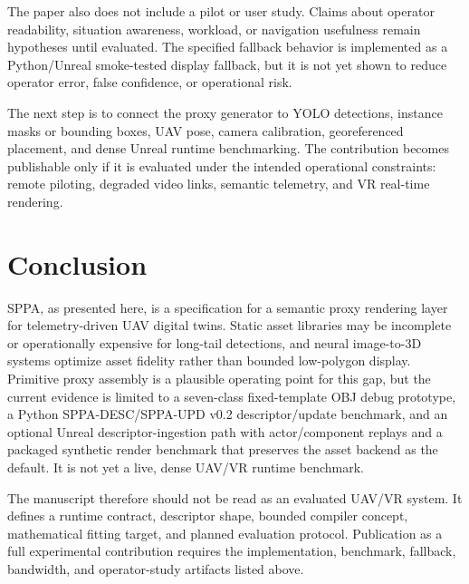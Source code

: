 ﻿\documentclass[11pt,a4paper]{article}
\begin{document}
The paper also does not include a pilot or user study. Claims about operator
readability, situation awareness, workload, or navigation usefulness remain
hypotheses until evaluated. The specified fallback behavior is implemented as a Python/Unreal smoke-tested display fallback, but it is not yet shown to reduce operator error, false confidence, or operational risk.

The next step is to connect the proxy generator to YOLO detections, instance
masks or bounding boxes, UAV pose, camera calibration, georeferenced placement,
and dense Unreal runtime benchmarking. The contribution becomes publishable only if it is
evaluated under the intended operational constraints: remote piloting, degraded
video links, semantic telemetry, and VR real-time rendering.

\section{Conclusion}

SPPA, as presented here, is a specification for a semantic proxy rendering layer
for telemetry-driven UAV digital twins. Static asset libraries may be incomplete
or operationally expensive for long-tail detections, and neural image-to-3D
systems optimize asset fidelity rather than bounded low-polygon display. Primitive proxy assembly is a
plausible operating point for this gap, but the current evidence is limited to a
seven-class fixed-template OBJ debug prototype, a Python SPPA-DESC/SPPA-UPD
v0.2 descriptor/update benchmark, and an optional Unreal descriptor-ingestion path with actor/component replays and
a packaged synthetic render benchmark that preserves the asset backend as the
default. It is not yet a live, dense UAV/VR runtime benchmark.

The manuscript therefore should not be read as an evaluated UAV/VR system. It
defines a runtime contract, descriptor shape, bounded compiler concept,
mathematical fitting target, and planned evaluation protocol. Publication as a
full experimental contribution requires the implementation, benchmark, fallback,
bandwidth, and operator-study artifacts listed above.



\end{document}
